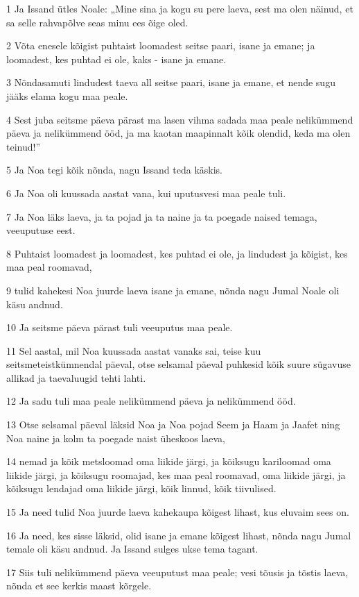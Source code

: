 \par 1 Ja Issand ütles Noale: „Mine sina ja kogu su pere laeva, sest ma olen näinud, et sa selle rahvapõlve seas minu ees õige oled.
\par 2 Võta enesele kõigist puhtaist loomadest seitse paari, isane ja emane; ja loomadest, kes puhtad ei ole, kaks - isane ja emane.
\par 3 Nõndasamuti lindudest taeva all seitse paari, isane ja emane, et nende sugu jääks elama kogu maa peale.
\par 4 Sest juba seitsme päeva pärast ma lasen vihma sadada maa peale nelikümmend päeva ja nelikümmend ööd, ja ma kaotan maapinnalt kõik olendid, keda ma olen teinud!”
\par 5 Ja Noa tegi kõik nõnda, nagu Issand teda käskis.
\par 6 Ja Noa oli kuussada aastat vana, kui uputusvesi maa peale tuli.
\par 7 Ja Noa läks laeva, ja ta pojad ja ta naine ja ta poegade naised temaga, veeuputuse eest.
\par 8 Puhtaist loomadest ja loomadest, kes puhtad ei ole, ja lindudest ja kõigist, kes maa peal roomavad,
\par 9 tulid kahekesi Noa juurde laeva isane ja emane, nõnda nagu Jumal Noale oli käsu andnud.
\par 10 Ja seitsme päeva pärast tuli veeuputus maa peale.
\par 11 Sel aastal, mil Noa kuussada aastat vanaks sai, teise kuu seitsmeteistkümnendal päeval, otse selsamal päeval puhkesid kõik suure sügavuse allikad ja taevaluugid tehti lahti.
\par 12 Ja sadu tuli maa peale nelikümmend päeva ja nelikümmend ööd.
\par 13 Otse selsamal päeval läksid Noa ja Noa pojad Seem ja Haam ja Jaafet ning Noa naine ja kolm ta poegade naist üheskoos laeva,
\par 14 nemad ja kõik metsloomad oma liikide järgi, ja kõiksugu kariloomad oma liikide järgi, ja kõiksugu roomajad, kes maa peal roomavad, oma liikide järgi, ja kõiksugu lendajad oma liikide järgi, kõik linnud, kõik tiivulised.
\par 15 Ja need tulid Noa juurde laeva kahekaupa kõigest lihast, kus eluvaim sees on.
\par 16 Ja need, kes sisse läksid, olid isane ja emane kõigest lihast, nõnda nagu Jumal temale oli käsu andnud. Ja Issand sulges ukse tema tagant.
\par 17 Siis tuli nelikümmend päeva veeuputust maa peale; vesi tõusis ja tõstis laeva, nõnda et see kerkis maast kõrgele.
